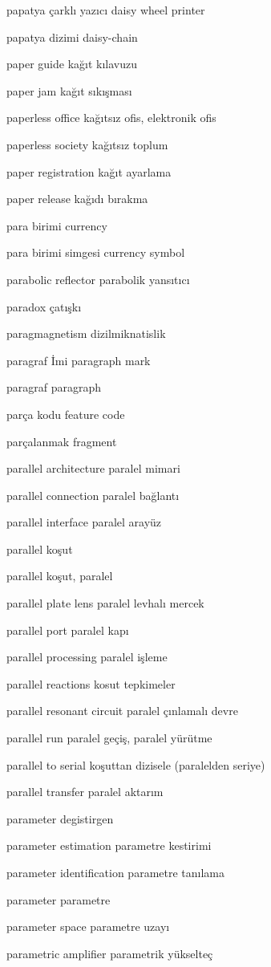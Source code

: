 \documentclass[12pt,fleqn]{article}\usepackage{../../common}
\begin{document}
papatya çarklı yazıcı daisy wheel printer

papatya dizimi daisy-chain

paper guide kağıt kılavuzu

paper jam kağıt sıkışması

paperless office kağıtsız ofis, elektronik ofis

paperless society kağıtsız toplum

paper registration kağıt ayarlama

paper release kağıdı bırakma

para birimi currency

para birimi simgesi currency symbol

parabolic reflector parabolik yansıtıcı

paradox çatışkı

paragmagnetism dizilmiknatislik

paragraf İmi paragraph mark

paragraf paragraph

parça kodu feature code

parçalanmak fragment

parallel architecture paralel mimari

parallel connection paralel bağlantı

parallel interface paralel arayüz

parallel koşut

parallel koşut, paralel

parallel plate lens paralel levhalı mercek

parallel port paralel kapı

parallel processing paralel işleme

parallel reactions kosut tepkimeler

parallel resonant circuit paralel çınlamalı devre

parallel run paralel geçiş, paralel yürütme

parallel to serial koşuttan dizisele (paralelden seriye)

parallel transfer paralel aktarım

parameter degistirgen

parameter estimation parametre kestirimi

parameter identification parametre tanılama

parameter parametre

parameter space parametre uzayı

parametric amplifier parametrik yükselteç
\end{document}
